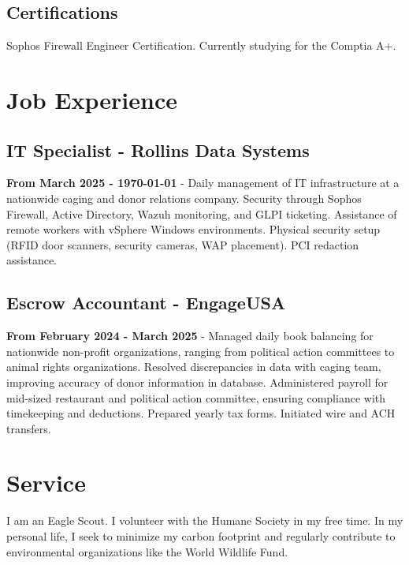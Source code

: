 \documentclass{article}
\begin{document}
\subsection{Certifications}

Sophos Firewall Engineer Certification. Currently studying for the Comptia A+. 

\section{Job Experience}


\subsection{IT Specialist - Rollins Data Systems}
\textbf{From March 2025 - \today} - Daily management of IT infrastructure at a nationwide caging and donor relations company. Security through Sophos Firewall, Active Directory, Wazuh monitoring, and GLPI ticketing. Assistance of remote workers with vSphere Windows environments. Physical security setup (RFID door scanners, security cameras, WAP placement). PCI redaction assistance. 


\subsection{Escrow Accountant - EngageUSA}
\textbf{From February 2024 - March 2025} - Managed daily book balancing for nationwide non-profit organizations, ranging from political action committees to animal rights organizations. Resolved discrepancies in data with caging team, improving accuracy of donor information in database. Administered payroll for mid-sized restaurant and political action committee, ensuring compliance with timekeeping and deductions. Prepared yearly tax forms. Initiated wire and ACH transfers.  

\section{Service}

I am an Eagle Scout. I volunteer with the Humane Society in my free time. In my personal life, I seek to minimize my carbon footprint and regularly contribute to environmental organizations like the World Wildlife Fund.  
\end{document}
